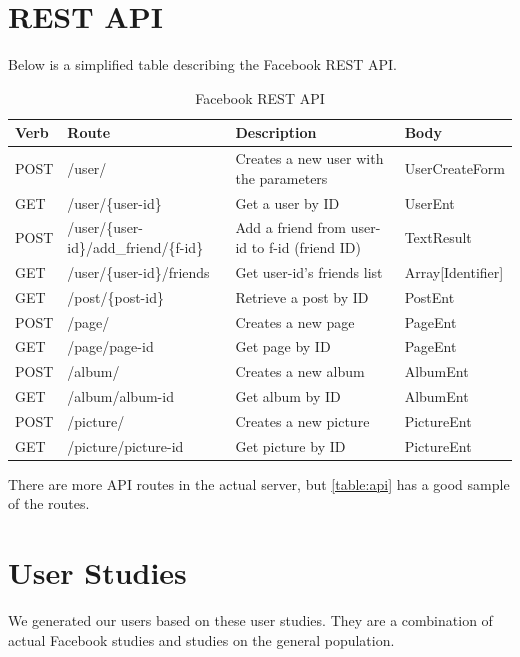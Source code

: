 \documentclass{article}
\begin{document}
\section*{REST API}
Below is a simplified table describing the Facebook REST API.

\begin{table}[H]
\centering
\begin{tabular}{|p{1cm}|p{5.5cm}|p{5.5cm}|p{2.53cm}|} 
 \hline
 Verb  & Route & Description  & Body\\ [0.5ex] \hline\hline
 POST  & /user/ & Creates a new user with the parameters & UserCreateForm\\ \hline
 GET & /user/\{user-id\} & Get a user by ID & UserEnt \\ \hline
 POST & /user/\{user-id\}/add\_friend/\{f-id\} & Add a friend from user-id to f-id (friend ID) & TextResult \\ \hline
 GET & /user/\{user-id\}/friends & Get user-id's friends list & Array[Identifier] \\ \hline
 GET & /post/\{post-id\} & Retrieve a post by ID  & PostEnt \\ [1ex] \hline
 POST & /page/ & Creates a new page & PageEnt \\ [1ex] \hline
 GET & /page/{page-id} & Get page by ID & PageEnt \\ [1ex] \hline
 POST & /album/ & Creates a new album & AlbumEnt \\ [1ex] \hline
 GET & /album/{album-id} & Get album by ID & AlbumEnt \\ [1ex] \hline
 POST & /picture/ & Creates a new picture & PictureEnt \\ [1ex] \hline
 GET & /picture/{picture-id} & Get picture by ID & PictureEnt \\ [1ex] \hline
\end{tabular}
\caption{Facebook REST API}
\label{table:api}
\end{table}

There are more API routes in the actual server, but \autoref{table:api} has a good sample of the routes.

\section*{User Studies}
We generated our users based on these user studies. They are a combination of actual Facebook studies and studies on the general population.
\end{document}
